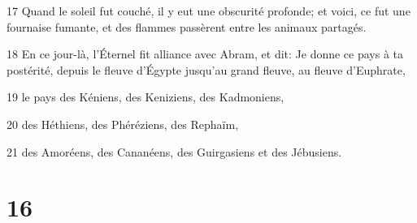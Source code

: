 \par 17 Quand le soleil fut couché, il y eut une obscurité profonde; et voici, ce fut une fournaise fumante, et des flammes passèrent entre les animaux partagés.
\par 18 En ce jour-là, l'Éternel fit alliance avec Abram, et dit: Je donne ce pays à ta postérité, depuis le fleuve d'Égypte jusqu'au grand fleuve, au fleuve d'Euphrate,
\par 19 le pays des Kéniens, des Keniziens, des Kadmoniens,
\par 20 des Héthiens, des Phéréziens, des Rephaïm,
\par 21 des Amoréens, des Cananéens, des Guirgasiens et des Jébusiens.

\chapter{16}

